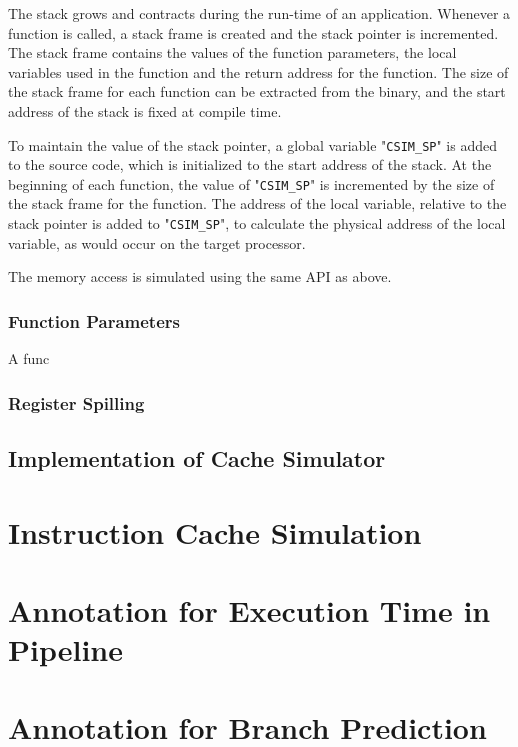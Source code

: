 The stack grows and contracts during the run-time of an application. Whenever a function is called, a stack frame is created and the stack pointer is incremented. The stack frame contains the values of the function parameters, the local variables used in the function and the return address for the function. The size of the stack frame for each function can be extracted from the binary, and the start address of the stack is fixed at compile time. 

To maintain the value of the stack pointer, a global variable "\texttt{CSIM\_SP}" is added to the source code, which is initialized to the start address of the stack. At the beginning of each function, the value of "\texttt{CSIM\_SP}" is incremented by the size of the stack frame for the function. The address of the local variable, relative to the stack pointer is added to "\texttt{CSIM\_SP}", to calculate the physical address of the local variable, as would occur on the target processor.

The memory access is simulated using the same API as above.

\subsubsection{Function Parameters}
A func

\subsubsection{Register Spilling}

\subsection{Implementation of Cache Simulator}

\section{Instruction Cache Simulation}

\section{Annotation for Execution Time in Pipeline}

\section{Annotation for Branch Prediction}








